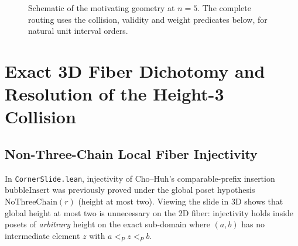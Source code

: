 \documentclass[11pt]{article}
\theoremstyle{definition}
\newcommand{\TP}{\mathcal{T}_P}
\begin{document}
\begin{figure}[ht]
\centering
{}
\caption{Schematic of the motivating geometry at $n=5$. The complete routing uses the collision, validity and weight predicates below, for natural unit interval orders.}
\label{fig:3d-slide}
\end{figure}

\section{Exact 3D Fiber Dichotomy and Resolution of the Height-3 Collision}

\subsection{Non-Three-Chain Local Fiber Injectivity}

In \texttt{CornerSlide.lean}, injectivity of Cho--Huh's comparable-prefix insertion $\mathrm{bubbleInsert}$ was previously proved under the global poset hypothesis $\mathrm{NoThreeChain}(r)$ (height at most two). Viewing the slide in $3\mathrm{D}$ shows that global height at most two is unnecessary on the 2D fiber: injectivity holds inside posets of \emph{arbitrary} height on the exact sub-domain where $(a, b)$ has no intermediate element $z$ with $a <_P z <_P b$.
\end{document}
